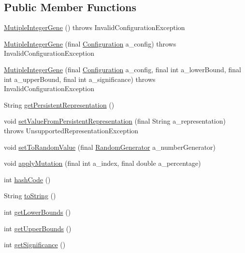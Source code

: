 \subsection*{Public Member Functions}
\begin{DoxyCompactItemize}
\item 
\hyperlink{classorg_1_1jgap_1_1impl_1_1_mutiple_integer_gene_aad62c2ae6280144f225f0b951484ae04}{Mutiple\-Integer\-Gene} ()  throws Invalid\-Configuration\-Exception 
\item 
\hyperlink{classorg_1_1jgap_1_1impl_1_1_mutiple_integer_gene_a2eb808b339b4b675d87305c6cc220c0d}{Mutiple\-Integer\-Gene} (final \hyperlink{classorg_1_1jgap_1_1_configuration}{Configuration} a\-\_\-config)  throws Invalid\-Configuration\-Exception 
\item 
\hyperlink{classorg_1_1jgap_1_1impl_1_1_mutiple_integer_gene_aeb94893f820a2e9a40e3b6f5d511ebbb}{Mutiple\-Integer\-Gene} (final \hyperlink{classorg_1_1jgap_1_1_configuration}{Configuration} a\-\_\-config, final int a\-\_\-lower\-Bound, final int a\-\_\-upper\-Bound, final int a\-\_\-significance)  throws Invalid\-Configuration\-Exception 
\item 
String \hyperlink{classorg_1_1jgap_1_1impl_1_1_mutiple_integer_gene_a2ee1d1c02b875f75243d7b510961990f}{get\-Persistent\-Representation} ()
\item 
void \hyperlink{classorg_1_1jgap_1_1impl_1_1_mutiple_integer_gene_a2cf38361dd0f05d2bf89031796caa0ec}{set\-Value\-From\-Persistent\-Representation} (final String a\-\_\-representation)  throws Unsupported\-Representation\-Exception 
\item 
void \hyperlink{classorg_1_1jgap_1_1impl_1_1_mutiple_integer_gene_a1e42e49869c7ae94d138a59e6c3600b6}{set\-To\-Random\-Value} (final \hyperlink{interfaceorg_1_1jgap_1_1_random_generator}{Random\-Generator} a\-\_\-number\-Generator)
\item 
void \hyperlink{classorg_1_1jgap_1_1impl_1_1_mutiple_integer_gene_ac3266677e324ec24bab4676d3cf9a08a}{apply\-Mutation} (final int a\-\_\-index, final double a\-\_\-percentage)
\item 
int \hyperlink{classorg_1_1jgap_1_1impl_1_1_mutiple_integer_gene_a4aa6d3e8c165272e0fb2cc890e64d62e}{hash\-Code} ()
\item 
String \hyperlink{classorg_1_1jgap_1_1impl_1_1_mutiple_integer_gene_af833c58712332cc2c981066f6e27bc63}{to\-String} ()
\item 
int \hyperlink{classorg_1_1jgap_1_1impl_1_1_mutiple_integer_gene_a8cec0495a3a53e2646349277304fef68}{get\-Lower\-Bounds} ()
\item 
int \hyperlink{classorg_1_1jgap_1_1impl_1_1_mutiple_integer_gene_a8d4a725a64b845406535a1b125d07d41}{get\-Upper\-Bounds} ()
\item 
int \hyperlink{classorg_1_1jgap_1_1impl_1_1_mutiple_integer_gene_ace6f9766316cfc949ff5853d4e1bd250}{get\-Significance} ()
\end{DoxyCompactItemize}
